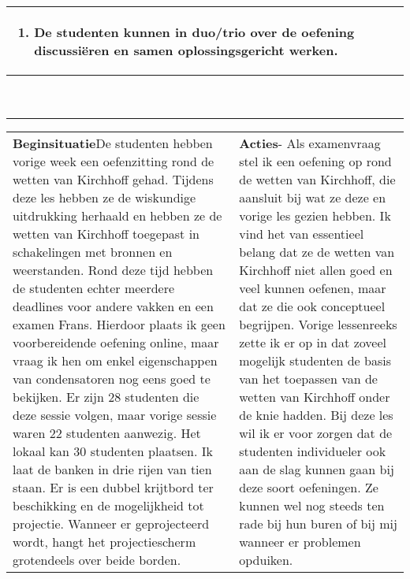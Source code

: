\begin{landscape}
\begin{tabularx}{1.56\textwidth}{|p{}|X|}
\begin{enumerate}[itemsep=0.08\baselineskip]
			\item De studenten kunnen in duo/trio over de oefening discussiëren en samen oplossingsgericht werken.
		\end{enumerate} \\\hline
		\multicolumn{2}{c}{ }\\
		\multicolumn{2}{c}{ }\\
		\multicolumn{2}{c}{ }\\
		\multicolumn{2}{c}{ }\\
		\multicolumn{2}{c}{ }\\
		\multicolumn{2}{c}{ }\\
		\multicolumn{2}{c}{ }\\
		\multicolumn{2}{c}{ }\\
		\multicolumn{2}{c}{ }\\
	\end{tabularx}
	
	
	\begin{tabularx}{1.56\textwidth}{|p{}|X|}
		\hline
		\multirow{2}{0.55\textwidth}{\textbf{Beginsituatie}\newline De studenten hebben vorige week een oefenzitting rond de wetten van Kirchhoff gehad. Tijdens deze les hebben ze de wiskundige uitdrukking herhaald en hebben ze de wetten van Kirchhoff toegepast in schakelingen met bronnen en weerstanden. Rond deze tijd hebben de studenten echter meerdere deadlines voor andere vakken en een examen Frans. Hierdoor plaats ik geen voorbereidende oefening online, maar vraag ik hen om enkel eigenschappen van condensatoren nog eens goed te bekijken. \newline\newline Er zijn 28 studenten die deze sessie volgen, maar vorige sessie waren 22 studenten aanwezig. \newline\newline Het lokaal kan 30 studenten plaatsen. Ik laat de banken in drie rijen van tien staan. Er is een dubbel krijtbord ter beschikking en de mogelijkheid tot projectie. Wanneer er geprojecteerd wordt, hangt het projectiescherm grotendeels over beide borden.  }& \textbf{Acties}\newline  -  Als examenvraag stel ik een oefening op rond de wetten van Kirchhoff, die aansluit bij wat ze deze en vorige les gezien hebben. Ik vind het van essentieel belang dat ze de wetten van Kirchhoff niet allen goed en veel kunnen oefenen, maar dat ze die ook conceptueel begrijpen. Vorige lessenreeks zette ik er op in dat zoveel mogelijk studenten de basis van het toepassen van de wetten van Kirchhoff onder de knie hadden. Bij deze les wil ik er voor zorgen dat de studenten individueler ook aan de slag kunnen gaan bij deze soort oefeningen. Ze kunnen wel nog steeds ten rade bij hun buren of bij mij wanneer er problemen opduiken. \newline\newline
		

\end{tabularx}
\end{landscape}
